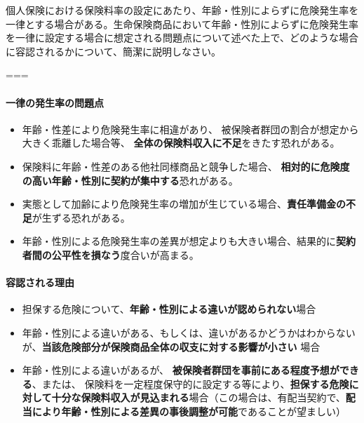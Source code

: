 \documentclass[report,gutter=10mm,fore-edge=10mm,uplatex,dvipdfmx]{jlreq}
\begin{document}

個人保険における保険料率の設定にあたり、年齢・性別によらずに危険発生率を一律とする場合がある。生命保険商品において年齢・性別によらずに危険発生率を一律に設定する場合に想定される問題点について述べた上で、どのような場合に容認されるかについて、簡潔に説明しなさい。

===


\paragraph{一律の発生率の問題点}

\begin{itemize}
\tightlist
\item
  年齢・性差により危険発生率に相違があり、
    被保険者群団の割合が想定から大きく乖離した場合等、
\textbf{全体の保険料収入に不足}をきたす恐れがある。
\item
    保険料に年齢・性差のある他社同様商品と競争した場合、
  \textbf{相対的に危険度の高い年齢・性別に契約が集中する}恐れがある。

\item
  実態として加齢により危険発生率の増加が生じている場合、\textbf{責任準備金の不足}が生ずる恐れがある。
\item
  年齢・性別による危険発生率の差異が想定よりも大きい場合、結果的に\textbf{契約者間の公平性を損なう}度合いが高まる。
\end{itemize}

\paragraph{容認される理由}

\begin{itemize}
\tightlist
\item
  担保する危険について、\textbf{年齢・性別による違いが認められない}場合
\item
  年齢・性別による違いがある、もしくは、違いがあるかどうかはわからないが、\textbf{当該危険部分が保険商品全体の収支に対する影響が小さい}
  場合
\item
  年齢・性別による違いがあるが、
    \textbf{被保険者群団を事前にある程度予想ができる}、または、
    保険料を一定程度保守的に設定する等により、\textbf{担保する危険に対して十分な保険料収入が見込まれる}場合（この場合は、有配当契約で、\textbf{配当により年齢・性別による差異の事後調整が可能}であることが望ましい）
\end{itemize}
\end{document}
